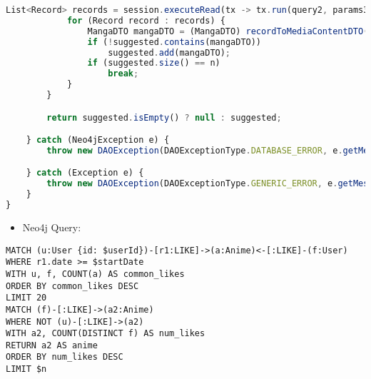 \begin{lstlisting}[language=JavaScript]
            List<Record> records = session.executeRead(tx -> tx.run(query2, params3).list());
            for (Record record : records) {
                MangaDTO mangaDTO = (MangaDTO) recordToMediaContentDTO(record);
                if (!suggested.contains(mangaDTO))
                    suggested.add(mangaDTO);
                if (suggested.size() == n)
                    break;
            }
        }

        return suggested.isEmpty() ? null : suggested;

    } catch (Neo4jException e) {
        throw new DAOException(DAOExceptionType.DATABASE_ERROR, e.getMessage());

    } catch (Exception e) {
        throw new DAOException(DAOExceptionType.GENERIC_ERROR, e.getMessage());
    }
}
\end{lstlisting}
\begin{itemize}
    \item Neo4j Query:
\end{itemize}
\begin{lstlisting}[language=Cypher]
MATCH (u:User {id: $userId})-[r1:LIKE]->(a:Anime)<-[:LIKE]-(f:User)
WHERE r1.date >= $startDate
WITH u, f, COUNT(a) AS common_likes
ORDER BY common_likes DESC
LIMIT 20
MATCH (f)-[:LIKE]->(a2:Anime)
WHERE NOT (u)-[:LIKE]->(a2)
WITH a2, COUNT(DISTINCT f) AS num_likes
RETURN a2 AS anime
ORDER BY num_likes DESC
LIMIT $n
\end{lstlisting}





